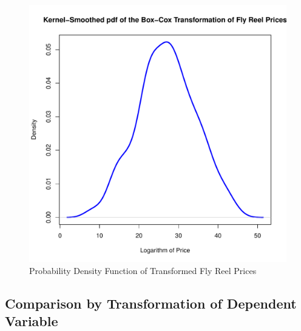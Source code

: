 \documentclass[11pt]{paper}
\begin{document}
\begin{figure}[h!]
  \centering
  \includegraphics[scale = 0.5, keepaspectratio=true]{../Figures/density_trans_prices}
  \caption{Probability Density Function of Transformed Fly Reel Prices} \label{fig:density_trans_prices}
\end{figure}

%
%
%
%



\subsection{Comparison by Transformation of Dependent Variable}
\end{document}
